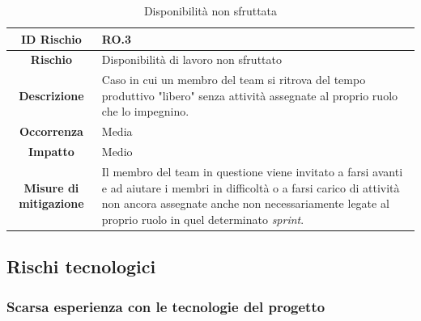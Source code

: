 \documentclass[10pt, a4paper]{article}
\begin{document}
{{{\renewcommand{\arraystretch}{1.5}
\begin{table}[H]
\begin{tabularx}{\textwidth}{c|X}
\textbf{ID Rischio} & RO.3 \\
\hline
\textbf{Rischio} & Disponibilità di lavoro non sfruttato \\
\hline
\textbf{Descrizione} & Caso in cui un membro del team si ritrova del tempo produttivo "libero" senza attività assegnate al proprio ruolo che lo impegnino.\\
\hline
\textbf{Occorrenza} & Media\\
\hline
\textbf{Impatto} & Medio\\
\hline
\textbf{Misure di mitigazione} & Il membro del team in questione viene invitato a farsi avanti e ad aiutare i membri in difficoltà o a farsi carico di attività non ancora assegnate anche non necessariamente legate al proprio ruolo in quel determinato \textit{sprint}. \\

\end{tabularx}
\caption{Disponibilità non sfruttata}
\end{table}




\subsection{Rischi tecnologici}

\subsubsection{Scarsa esperienza con le tecnologie del progetto}

}}}
\end{document}
